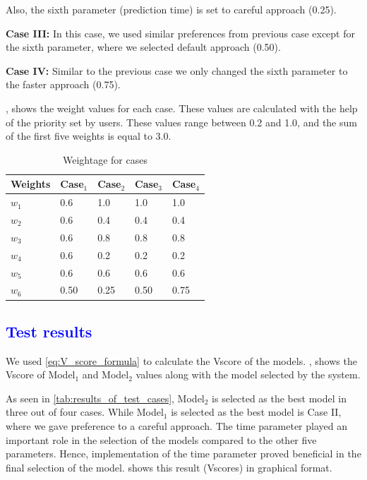 \documentclass[a4paper,fleqn]{cas-dc}
\newcommand{\responsemodsm}[1]{\textcolor{blue}{#1}}
\newcommand{\subsectionb}[1]{\subsection{\responsemodsm{#1}}}
\begin{document}
\noindent
Also, the sixth parameter (prediction time) is set to careful approach (0.25).

\vspace*{0.5em}
\noindent
{\bfseries Case III:} In this case, we used similar preferences from previous case except for the sixth parameter, where we selected default approach (0.50).

\vspace*{0.5em}
\noindent
{\bfseries Case IV:} Similar to the previous case we only changed the sixth parameter to the faster approach (0.75).

\vspace*{0.5em}
, shows the weight values for each case. These values are calculated with the help of the priority set by users. These values range between 0.2 and 1.0, and the sum of the first five weights is equal to 3.0.

\begin{table}[h]
    \caption{Weightage for cases}\label{tab:wieghtage_for_cases}
    \begin{tabular*}{\tblwidth}{@{}LLLLL@{}}
        \toprule
        Weights & Case$_1$ & Case$_2$ & Case$_3$ & Case$_4$ \\
        \midrule
        $w_1$ & 0.6 & 1.0 & 1.0 & 1.0 \\
        $w_2$ & 0.6 & 0.4 & 0.4 & 0.4 \\
        $w_3$ & 0.6 & 0.8 & 0.8 & 0.8 \\
        $w_4$ & 0.6 & 0.2 & 0.2 & 0.2 \\
        $w_5$ & 0.6 & 0.6 & 0.6 & 0.6 \\
        $w_6$ & 0.50 & 0.25 & 0.50 & 0.75 \\
        \bottomrule
    \end{tabular*}
\end{table}

\subsectionb{Test results}\label{subsec:results_and_discussion}
We used \cref{eq:V_score_formula} to calculate the Vscore of the models. , shows the Vscore of Model$_1$ and Model$_2$ values along with the model selected by the system.

As seen in \cref{tab:results_of_test_cases}, Model$_2$ is selected as the best model in three out of four cases. While Model$_1$ is selected as the best model is Case II, where we gave preference to a careful approach. The time parameter played an important role in the selection of the models compared to the other five parameters. Hence, implementation of the time parameter proved beneficial in the final selection of the model.  shows this result (Vscores) in graphical format.
\end{document}
